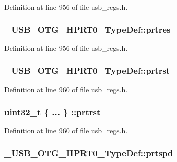 Definition at line 956 of file usb\-\_\-regs.\-h.

\hypertarget{group___u_s_b___o_t_g___d_r_i_v_e_r_ga159a812d06243cc7e536c4439ca4812b}{
\subsubsection[{prtres}]{ \-\_\-\-U\-S\-B\-\_\-\-O\-T\-G\-\_\-\-H\-P\-R\-T0\-\_\-\-Type\-Def\-::prtres}}\label{group___u_s_b___o_t_g___d_r_i_v_e_r_ga159a812d06243cc7e536c4439ca4812b}


Definition at line 956 of file usb\-\_\-regs.\-h.

\hypertarget{group___u_s_b___o_t_g___d_r_i_v_e_r_ga4511b9044f1fa4b5fb1127e8bc723bbf}{
\subsubsection[{prtrst}]{ \-\_\-\-U\-S\-B\-\_\-\-O\-T\-G\-\_\-\-H\-P\-R\-T0\-\_\-\-Type\-Def\-::prtrst}}\label{group___u_s_b___o_t_g___d_r_i_v_e_r_ga4511b9044f1fa4b5fb1127e8bc723bbf}


Definition at line 960 of file usb\-\_\-regs.\-h.

\hypertarget{group___u_s_b___o_t_g___d_r_i_v_e_r_ga49ea29ab9ff83b1ab9f821e63ba684f4}{
\subsubsection[{prtrst}]{\setlength{\rightskip}{0pt plus 5cm}uint32\-\_\-t \{ ... \} \-::prtrst}}\label{group___u_s_b___o_t_g___d_r_i_v_e_r_ga49ea29ab9ff83b1ab9f821e63ba684f4}


Definition at line 960 of file usb\-\_\-regs.\-h.

\hypertarget{group___u_s_b___o_t_g___d_r_i_v_e_r_gac4a7f33605ec1bf4c6d9bf5127dfd6b4}{
\subsubsection[{prtspd}]{ \-\_\-\-U\-S\-B\-\_\-\-O\-T\-G\-\_\-\-H\-P\-R\-T0\-\_\-\-Type\-Def\-::prtspd}}\label{group___u_s_b___o_t_g___d_r_i_v_e_r_gac4a7f33605ec1bf4c6d9bf5127dfd6b4}


